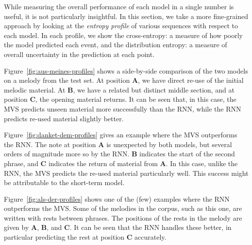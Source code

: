 \documentclass[12pt,a4paper,twoside,openright]{report}
\begin{document}
While measuring the overall performance of each model in a single number is
useful, it is not particularly insightful. In this section, we take a more
fine-grained approach by looking at the \emph{entropy profile} of various
sequences with respect to each model. In each profile, we show the
cross-entropy: a measure of how poorly the model predicted each event, and the
distribution entropy: a measure of overall uncertainty in the prediction at each
point.

Figure~\ref{fig:aus-meines-profiles} shows a side-by-side comparison of the two
models on a melody from the test set. At position \textbf{A}, we have direct
re-use of the initial melodic material. At \textbf{B}, we have a related but
distinct middle section, and at position \textbf{C}, the opening material
returns. It can be seen that, in this case, the MVS predicts unseen material
more successfully than the RNN, while the RNN predicts re-used material slightly
better.

Figure~\ref{fig:danket-dem-profiles} gives an example where the MVS outperforms
the RNN. The note at position \textbf{A} is unexpected by both models, but
several orders of magnitude more so by the RNN. \textbf{B} indicates the start
of the second phrase, and \textbf{C} indicates the return of material from
\textbf{A}. In this case, unlike the RNN, the MVS predicts the re-used material
particularly well. This success might be attributable to the short-term model.

Figure~\ref{fig:als-der-profiles} shows one of the (few) examples where the RNN
outperforms the MVS. Some of the melodies in the corpus, such as this one, are
written with rests between phrases. The positions of the rests in the melody
are given by \textbf{A}, \textbf{B}, and \textbf{C}. It can be seen that the RNN
handles these better, in particular predicting the rest at position \textbf{C}
accurately.
\end{document}
